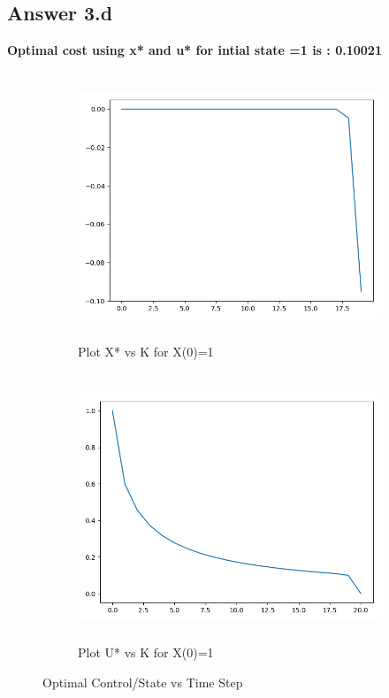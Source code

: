 \documentclass[12pt]{article}
\begin{document}
\subsection*{Answer 3.d}

{
\bfseries Optimal cost using x* and u*  for intial state =1 is : 0.10021 \\
}

\begin{figure}[H]
\begin{subfigure}{}
\centering
\includegraphics[width=10cm, height=8cm, centre]{3dkx.png} 
\caption{Plot X* vs K for X(0)=1}
\label{fig:subim1}
\end{subfigure}

\begin{subfigure}{}
\centering
\includegraphics[width=10cm, height=8cm, centre]{3dku.png} 
\caption{Plot U* vs K for X(0)=1}
\label{fig:subim1}
\end{subfigure}

\caption{Optimal Control/State vs Time Step}
\label{fig:image2}
\end{figure}
\end{document}
